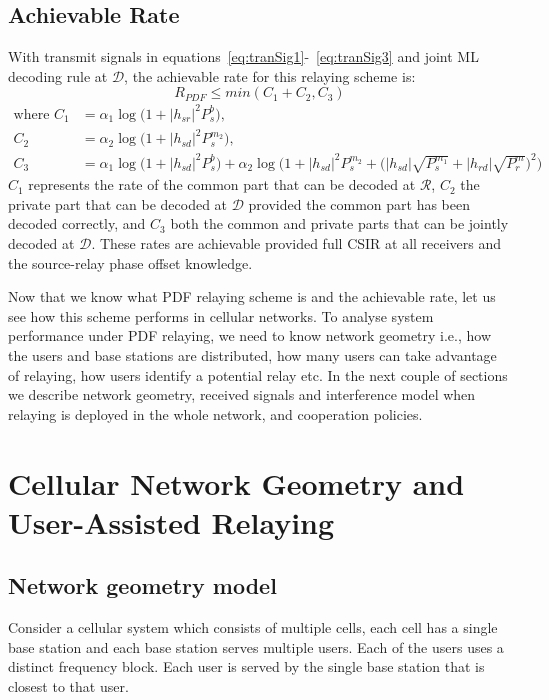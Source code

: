 \documentclass[titlepage]{article}
\begin{document}
\subsection{Achievable Rate}
With transmit signals in equations~\ref{eq:tranSig1}-~\ref{eq:tranSig3} and joint ML decoding rule at $\mathcal{D}$, the achievable rate for this relaying scheme is:
\begin{equation} \label{eq:rate}
R_{PDF} \leq min(C_1+C_2,C_3)
\end{equation}
\begin{align}
\text{where } C_1 &= \alpha_1 \log\Big(1+|h_{sr}|^2P_s^b\Big),\\
C_2 &= \alpha_2 \log\Big(1+|h_{sd}|^2P_s^{m_2}\Big),\\
C_3 &= \alpha_1 \log\Big(1+|h_{sd}|^2P_s^b\Big) + \alpha_2\log\bigg(1+|h_{sd}|^2P_s^{m_2} + \Big(|h_{sd}|\sqrt{P_s^{m_1}} + |h_{rd}|\sqrt{P_r^m}\Big)^2\bigg)
\end{align}
$C_1$ represents the rate of the common part that can be decoded at $\mathcal{R}$, $C_2$  the private part that can be decoded at $\mathcal{D}$ provided the common part has been decoded correctly, and $C_3$ both the common and private parts that can be jointly decoded at $\mathcal{D}$. These rates are achievable provided full CSIR at all receivers and the source-relay phase offset knowledge.
\par
Now that we know what PDF relaying scheme is and the achievable rate, let us see how this scheme performs in cellular networks. To analyse system performance under PDF relaying, we need to know network geometry i.e., how the users and base stations are distributed, how many users can take advantage of relaying, how users identify a potential relay etc. In the next couple of sections we describe network geometry,  received signals and interference model when relaying is deployed in the whole network, and cooperation policies.

\section{Cellular Network Geometry and User-Assisted Relaying}

\subsection{Network geometry model}
Consider a cellular system which consists of multiple
cells, each cell has a single base station and each base station
serves multiple users. Each of the users uses a distinct frequency
block. Each user is served by the single base station that
is closest to that user.
\end{document}
